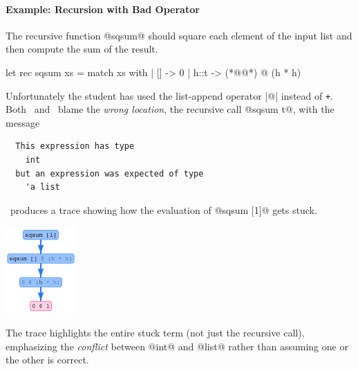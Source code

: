 \paragraph{Example: Recursion with Bad Operator}
The recursive function @sqsum@ should square each
element of the input list and then compute the sum
of the result.
%
\begin{ecode}
  let rec sqsum xs = match xs with
    | [] -> 0
    | h::t -> (*@@*) @ (h * h)
\end{ecode}
%
Unfortunately the student has used the list-append
operator |@| instead of \texttt{+}. %
%
Both \ocaml\ and \sherrloc\ blame the \emph{wrong location},
the recursive call @sqsum t@, with the message
%
\begin{verbatim}
  This expression has type
    int
  but an expression was expected of type
    'a list
\end{verbatim}
%
\toolname\ produces a trace showing how the evaluation of
@sqsum [1]@ gets stuck.
%
\begin{center}
  \includegraphics[height=125px]{sqsum.png}
\end{center}
%
The trace highlights the entire stuck term
(not just the recursive call), emphasizing
the \emph{conflict} between @int@ and @list@
rather than assuming one or the other is correct.

